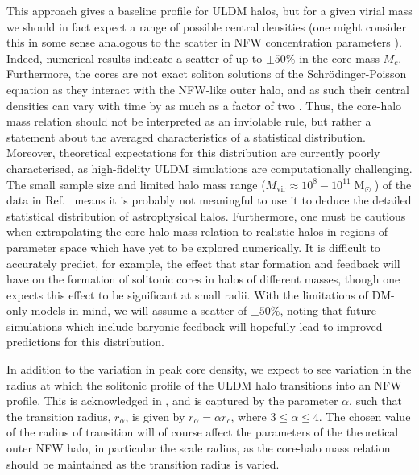 \documentclass[a4paper,11pt]{article}
\begin{document}
This approach gives a baseline profile for ULDM halos, but for a given virial mass we should in fact expect a range of possible central densities (one might consider this in some sense analogous to the scatter in NFW concentration parameters \cite{Maccio:2008pcd}). Indeed, numerical results \cite{Schive:2014hza} indicate a scatter of up to $\pm 50\%$ in the core mass $M_c$. Furthermore, the cores are not exact soliton solutions of the Schr\"{o}dinger-Poisson equation as they interact with the NFW-like outer halo, and as such their central densities can vary with time by as much as a factor of two \cite{Veltmaat:2018dfz}. Thus, the core-halo mass relation should not be interpreted as an inviolable rule, but rather a statement about the averaged characteristics of a statistical distribution. Moreover, theoretical expectations for this distribution are currently poorly characterised, as high-fidelity ULDM simulations are computationally challenging. The small sample size and limited halo mass range ($ M_{\mathrm{vir}} \approx 10^8-10^{11} \operatorname{M}_{\odot}$) of the data in Ref.~\cite{Schive:2014hza} means it is probably not meaningful to use it to deduce the detailed statistical distribution of astrophysical halos. Furthermore, one must be cautious when extrapolating the core-halo mass relation to realistic halos in regions of parameter space which have yet to be explored numerically. It is difficult to accurately predict, for example, the effect that star formation and feedback will have on the formation of solitonic cores in halos of different masses, though one expects this effect to be significant at small radii. With the limitations of DM-only models in mind, we will  assume a scatter of $\pm 50\%$, noting that future simulations which include baryonic feedback will hopefully lead to improved predictions for this distribution. 

In addition to the variation in peak core density, we expect to see variation in the radius at which the solitonic profile of the ULDM halo transitions into an NFW profile. This is acknowledged in \cite{Robles:2018fur}, and is captured by the parameter $\alpha$, such that the transition radius, $r_{\alpha}$, is given by $r_{\alpha} = \alpha r_c$, where $3 \leq \alpha \leq 4$. The chosen value of the radius of transition will of course affect the parameters of the theoretical outer NFW halo, in particular the scale radius, as the core-halo mass relation should be maintained as the transition radius is varied.
\end{document}
